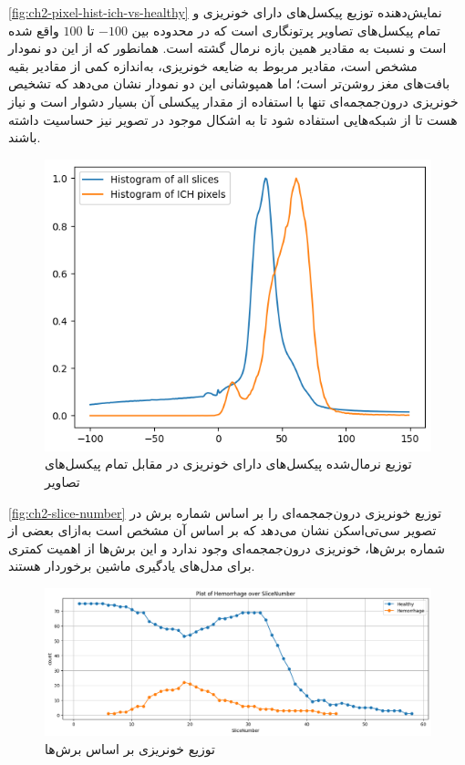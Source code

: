 \autoref{fig:ch2-pixel-hist-ich-vs-healthy}
نمایش‌دهنده توزیع پیکسل‌های دارای خونریزی و تمام پیکسل‌های تصاویر پرتونگاری است که در محدوده بین 
$-100$
تا 
$100$
واقع شده است و نسبت به مقادیر همین بازه نرمال گشته است. همانطور که از این دو نمودار مشخص است، مقادیر مربوط به ضایعه خونریزی،‌ به‌اندازه کمی از مقادیر بقیه بافت‌های مغز روشن‌تر است؛ اما همپوشانی این دو نمودار نشان می‌دهد که تشخیص خونریزی درون‌جمجمه‌ای تنها با استفاده از مقدار پیکسلی آن بسیار دشوار است و نیاز هست تا از شبکه‌هایی استفاده شود تا به اشکال موجود در تصویر نیز حساسیت داشته باشند.


\begin{figure}[h]
\centering
\includegraphics[width=1.0\linewidth]{"Images/Chapter2/pixel hist ich vs healthy"}
\caption{توزیع نرمال‌شده پیکسل‌های دارای خونریزی در مقابل تمام پیکسل‌های تصاویر}
\label{fig:ch2-pixel-hist-ich-vs-healthy}
\end{figure}


\autoref{fig:ch2-slice-number}
توزیع خونریزی درون‌جمجمه‌ای را بر اساس شماره برش در تصویر سی‌تی‌اسکن نشان می‌دهد که بر اساس آن مشخص است به‌ازای بعضی از شماره برش‌ها، خونریزی درون‌جمجمه‌ای وجود ندارد و این برش‌ها از اهمیت کمتری برای مدل‌های یادگیری ماشین برخوردار هستند.

\begin{figure}[h]
\centering
\includegraphics[width=1.0\linewidth]{"Images/Chapter2/slice hist"}
\caption{توزیع خونریزی بر اساس برش‌ها}
\label{fig:ch2-slice-hist}
\end{figure}


